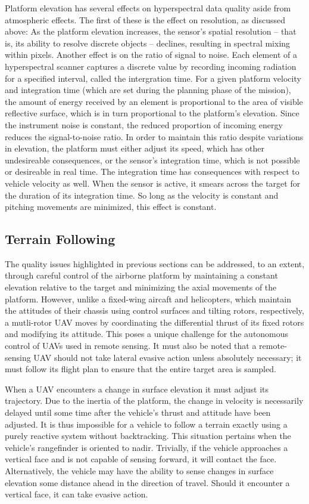 \documentclass[10pt,a4paper]{report}
\begin{document}
Platform elevation has several effects on hyperspectral data quality aside from atmospheric effects. The first of these is the effect on resolution, as discussed above: As the platform elevation increases, the sensor's spatial resolution -- that is, its ability to resolve discrete objects -- declines, resulting in spectral mixing within pixels. Another effect is on the ratio of signal to noise. Each element of a hyperspectral scanner captures a discrete value by recording incoming radiation for a specified interval, called the intergration time. For a given platform velocity and integration time (which are set during the planning phase of the mission), the amount of energy received by an element is proportional to the area of visible reflective surface, which is in turn proportional to the platform's elevation. Since the instrument noise is constant, the reduced proportion of incoming energy reduces the signal-to-noise ratio. In order to maintain this ratio despite variations in elevation, the platform must either adjust its speed, which has other undesireable consequences, or the sensor's integration time, which is not possible or desireable in real time. The integration time has consequences with respect to vehicle velocity as well. When the sensor is active, it smears across the target for the duration of its integration time. So long as the velocity is constant and pitching movements are minimized, this effect is constant.

\subsection{Terrain Following}

The quality issues highlighted in previous sections can be addressed, to an extent, through careful control of the airborne platform by maintaining a constant elevation relative to the target and minimizing the axial movements of the platform. However, unlike a fixed-wing aircaft and helicopters, which maintain the attitudes of their chassis using control surfaces and tilting rotors, respectively, a mutli-rotor UAV moves by coordinating the differential thrust of its fixed rotors and modifying its attitude. This poses a unique challenge for the autonomous control of UAVs used in remote sensing. It must also be noted that a remote-sensing UAV should not take lateral evasive action unless absolutely necessary; it must follow its flight plan to ensure that the entire target area is sampled.

When a UAV encounters a change in surface elevation it must adjust its trajectory. Due to the inertia of the platform, the change in velocity is  necessarily delayed until some time after the vehicle's thrust and attitude have been adjusted. It is thus impossible for a vehicle to follow a terrain exactly using a purely reactive system without backtracking. This situation pertains when the vehicle's rangefinder is oriented to nadir. Trivially, if the vehicle approaches a vertical face and is not capable of sensing forward, it will contact the face. Alternatively, the vehicle may have the ability to sense changes in surface elevation some distance ahead in the direction of travel. Should it encounter a vertical face, it can take evasive action.
\end{document}
